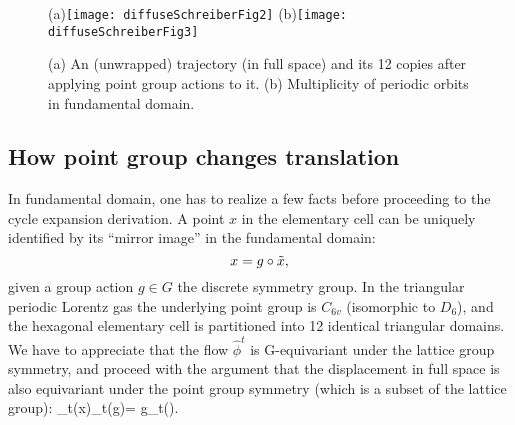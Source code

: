 \documentclass[aps,pre,
                showpacs,
                twocolumn,
                groupedaddress,
                floatfix]{revtex4-1}
\begin{document}
\begin{figure}[htbp]
  \begin{center}
    (a)\texttt{[image: diffuseSchreiberFig2]}
    (b)\texttt{[image: diffuseSchreiberFig3]}
  \end{center}
  \caption[]{ \label{fig:schrieberFig23} (a) An (unwrapped) trajectory (in full
  space) and its 12 copies after applying point group actions to it. (b)
  Multiplicity of periodic orbits in fundamental domain.}
\end{figure}

\subsection{How point group changes translation}


In fundamental domain, one has to realize a few facts before proceeding to the
cycle expansion derivation. A point $x$ in the elementary cell can be uniquely
identified by its ``mirror image'' in the fundamental domain:
\[
x=g\circ\tilde x,
\]
given a group action $g\in G$ the discrete symmetry group. In the triangular
periodic Lorentz gas the underlying point group is $C_{6v}$ (isomorphic to
$D_6$), and the hexagonal elementary cell is partitioned into 12 identical
triangular domains. We have to appreciate that the flow $\hat{\phi}^t$ is
G-equivariant under the lattice group symmetry, and proceed with the argument
that the displacement in full space is also equivariant under the point group
symmetry (which is a subset of the lattice group):
\beq
\hn_t(x)\equiv\hn_t(g\circ\tx)= g\circ\hn_t(\tx).
\eeq
\end{document}

